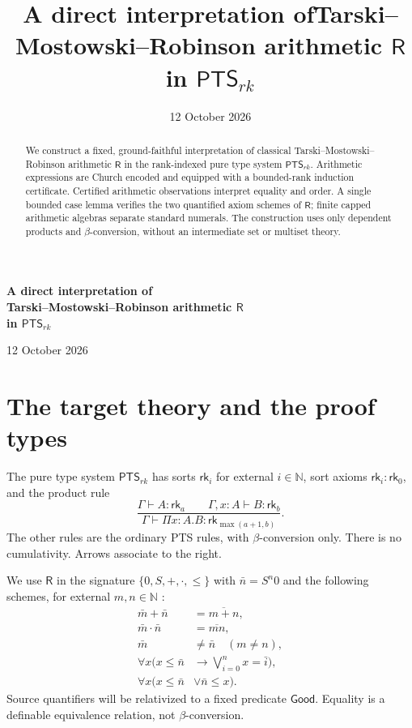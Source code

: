 \documentclass[11pt,a4paper]{article}
\title{\bfseries A direct interpretation of\newline Tarski--Mostowski--Robinson arithmetic $\mathsf R$\newline in $\mathsf{PTS}_{rk}$}
\author{}\date{12 October 2026}
\newcommand{\rk}[1]{\mathsf{rk}_{#1}}
\newcommand{\PTS}{\mathsf{PTS}_{rk}}
\newcommand{\RR}{\mathsf R}
\newcommand{\Good}{\mathsf{Good}}
\theoremstyle{remark}\newtheorem*{remark}{Remark}
\begin{document}
\begin{center}
{\Large\bfseries A direct interpretation of\\[3pt]
Tarski--Mostowski--Robinson arithmetic $\mathsf R$\\[3pt]
in $\mathsf{PTS}_{rk}$\par}
\vspace{9pt}
12 October 2026
\end{center}
\thispagestyle{plain}
\begin{abstract}
We construct a fixed, ground-faithful interpretation of classical
Tarski--Mostowski--Robinson arithmetic $\RR$ in the rank-indexed pure type
system $\PTS$. Arithmetic expressions are Church encoded and equipped with
a bounded-rank induction certificate. Certified arithmetic observations
interpret equality and order. A single bounded case lemma verifies the two
quantified axiom schemes of $\RR$; finite capped arithmetic algebras separate
standard numerals. The construction uses only dependent products and
$\beta$-conversion, without an intermediate set or multiset theory.
\end{abstract}

\section{The target theory and the proof types}
The pure type system $\PTS$ has sorts $\rk i$ for external $i\in\mathbb N$,
sort axioms $\rk i:\rk0$, and the product rule
\[
 \frac{\Gamma\vdash A:\rk a\qquad\Gamma,x:A\vdash B:\rk b}
 {\Gamma\vdash\Pi x:A.B:\rk{\max(a+1,b)}}.
\]
The other rules are the ordinary PTS rules, with $\beta$-conversion only.
There is no cumulativity. Arrows associate to the right.

We use $\RR$ in the signature $\{0,S,+,\cdot,\leq\}$ with
$\bar n=S^n0$ and the following schemes, for external $m,n\in\mathbb N$
\cite{tmr}\cite[Definition~1.1]{kurahashi}:
\begin{align}
 \bar m+\bar n&=\overline{m+n}, \tag{R1}\label{eq:r1}\\
 \bar m\cdot\bar n&=\overline{mn}, \tag{R2}\label{eq:r2}\\
 \bar m&\ne\bar n\quad(m\ne n), \tag{R3}\label{eq:r3}\\
 \forall x\bigl(x\leq\bar n&\to\bigvee_{i=0}^n x=\bar i\bigr),
 \tag{R4}\label{eq:r4}\\
 \forall x\bigl(x\leq\bar n&\lor\bar n\leq x\bigr).
 \tag{R5}\label{eq:r5}
\end{align}
Source quantifiers will be relativized to a fixed predicate $\Good$.
Equality is a definable equivalence relation, not $\beta$-conversion.
\end{document}
